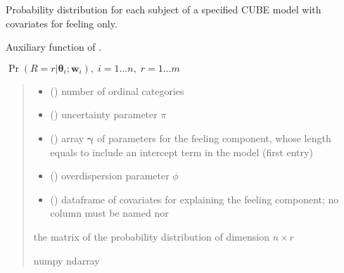 \documentclass[letterpaper,10pt,english]{sphinxmanual}
\begin{document}

\begin{fulllineitems}
\label{\detokenize{cubmods:cubmods.cube_0w0.pmfi}}
\pysigstartsignatures
{}
\pysigstopsignatures
\sphinxAtStartPar
Probability distribution for each subject of a specified CUBE model 
with covariates for feeling only.

\sphinxAtStartPar
Auxiliary function of .

\sphinxAtStartPar
\(\Pr(R = r | \pmb\theta_i ; \pmb w_i),\; i=1 \ldots n ,\; r=1 \ldots m\)
\begin{quote}\begin{description}
\begin{itemize}
\item {} 
\sphinxAtStartPar
{} () \textendash{} number of ordinal categories

\item {} 
\sphinxAtStartPar
{} () \textendash{} uncertainty parameter \(\pi\)

\item {} 
\sphinxAtStartPar
{} () \textendash{} array \(\pmb \gamma\) of parameters for the feeling component, whose length equals 
 to include an intercept term in the model (first entry)

\item {} 
\sphinxAtStartPar
{} () \textendash{} overdispersion parameter \(\phi\)

\item {} 
\sphinxAtStartPar
{} () \textendash{} dataframe of covariates for explaining the feeling component;
no column must be named  nor 

\end{itemize}

\sphinxAtStartPar
the matrix of the probability distribution of dimension \(n \times r\)

\sphinxAtStartPar
numpy ndarray

\end{description}\end{quote}

\end{fulllineitems}
\end{document}
